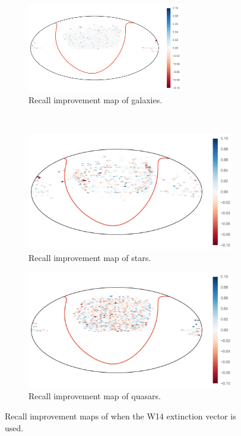 \begin{figure}[p]
	\centering
	\begin{subfigure}{\textwidth}
		\centering
		\includegraphics[width=0.75\textwidth]{figures/appendix/map_recall_w14_Galaxy}
		\caption{Recall improvement map of galaxies.}
		\label{fig:map_recall_w14_galaxies}
	\end{subfigure}\\
	\begin{subfigure}{\textwidth}
		\centering
		\includegraphics[width=0.75\linewidth]{figures/appendix/map_recall_w14_Star}
		\caption{Recall improvement map of stars.}
		\label{fig:map_recall_w14_stars}
	\end{subfigure}
	\begin{subfigure}{\textwidth}
		\centering
		\includegraphics[width=0.75\linewidth]{figures/appendix/map_recall_w14_Quasar}
		\caption{Recall improvement map of quasars.}
		\label{fig:map_recall_w14_quasars}
	\end{subfigure}
	\caption[Recall improvement maps with W14]{
        Recall improvement maps of when the W14 extinction vector is used.}
	\label{fig:map_recall_w14}
\end{figure}



